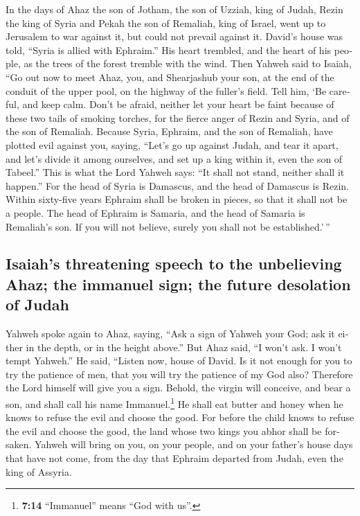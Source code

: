 \begin{paracol}{2}
\begin{otherlanguage}{english}
 In the days of Ahaz the son of Jotham, the son of Uzziah,
king of Judah, Rezin the king of Syria and Pekah the son of Remaliah,
king of Israel, went up to Jerusalem to war against it, but could not
prevail against it.  David's house was told, ``Syria is
allied with Ephraim.'' His heart trembled, and the heart of his people,
as the trees of the forest tremble with the wind.  Then
Yahweh said to Isaiah, ``Go out now to meet Ahaz, you, and Shearjashub
your son, at the end of the conduit of the upper pool, on the highway of
the fuller's field.  Tell him, `Be careful, and keep calm.
Don't be afraid, neither let your heart be faint because of these two
tails of smoking torches, for the fierce anger of Rezin and Syria, and
of the son of Remaliah.  Because Syria, Ephraim, and the
son of Remaliah, have plotted evil against you, saying, 
``Let's go up against Judah, and tear it apart, and let's divide it
among ourselves, and set up a king within it, even the son of Tabeel.''
 This is what the Lord Yahweh says: ``It shall not stand,
neither shall it happen.''  For the head of Syria is
Damascus, and the head of Damascus is Rezin. Within sixty-five years
Ephraim shall be broken in pieces, so that it shall not be a people.
 The head of Ephraim is Samaria, and the head of Samaria
is Remaliah's son. If you will not believe, surely you shall not be
established.'\,''

\hypertarget{isaiahs-threatening-speech-to-the-unbelieving-ahaz-the-immanuel-sign-the-future-desolation-of-judah}{%
\subsection{Isaiah's threatening speech to the unbelieving Ahaz; the
immanuel sign; the future desolation of
Judah}\label{isaiahs-threatening-speech-to-the-unbelieving-ahaz-the-immanuel-sign-the-future-desolation-of-judah}}

 Yahweh spoke again to Ahaz, saying, 
``Ask a sign of Yahweh your God; ask it either in the depth, or in the
height above.''  But Ahaz said, ``I won't ask. I won't
tempt Yahweh.''  He said, ``Listen now, house of David.
Is it not enough for you to try the patience of men, that you will try
the patience of my God also?  Therefore the Lord himself
will give you a sign. Behold, the virgin will conceive, and bear a son,
and shall call his name Immanuel.\footnote{\textbf{7:14} ``Immanuel''
  means ``God with us''.}  He shall eat butter and honey
when he knows to refuse the evil and choose the good. 
For before the child knows to refuse the evil and choose the good, the
land whose two kings you abhor shall be forsaken.  Yahweh
will bring on you, on your people, and on your father's house days that
have not come, from the day that Ephraim departed from Judah, even the
king of Assyria.


\end{otherlanguage}
\end{paracol}
